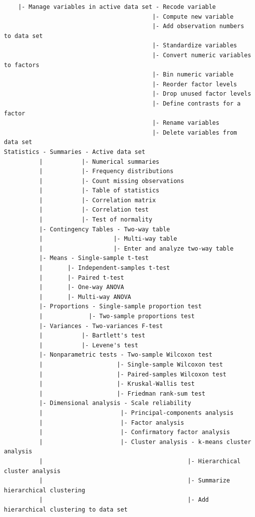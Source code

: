 \documentclass{article}%
\begin{document}
\begin{verbatim}
    |- Manage variables in active data set - Recode variable
                                          |- Compute new variable
                                          |- Add observation numbers to data set
                                          |- Standardize variables
                                          |- Convert numeric variables to factors
                                          |- Bin numeric variable
                                          |- Reorder factor levels
                                          |- Drop unused factor levels
                                          |- Define contrasts for a factor
                                          |- Rename variables
                                          |- Delete variables from data set
Statistics - Summaries - Active data set
          |           |- Numerical summaries
          |           |- Frequency distributions
          |           |- Count missing observations
          |           |- Table of statistics
          |           |- Correlation matrix
          |           |- Correlation test
          |           |- Test of normality
          |- Contingency Tables - Two-way table
          |                    |- Multi-way table
          |                    |- Enter and analyze two-way table
          |- Means - Single-sample t-test
          |       |- Independent-samples t-test
          |       |- Paired t-test
          |       |- One-way ANOVA
          |       |- Multi-way ANOVA
          |- Proportions - Single-sample proportion test
          |             |- Two-sample proportions test
          |- Variances - Two-variances F-test
          |           |- Bartlett's test
          |           |- Levene's test
          |- Nonparametric tests - Two-sample Wilcoxon test
          |                     |- Single-sample Wilcoxon test
          |                     |- Paired-samples Wilcoxon test
          |                     |- Kruskal-Wallis test
          |                     |- Friedman rank-sum test
          |- Dimensional analysis - Scale reliability
          |                      |- Principal-components analysis
          |                      |- Factor analysis
          |                      |- Confirmatory factor analysis
          |                      |- Cluster analysis - k-means cluster analysis
          |                                         |- Hierarchical cluster analysis
          |                                         |- Summarize hierarchical clustering
          |                                         |- Add hierarchical clustering to data set

\end{verbatim}
\end{document}
